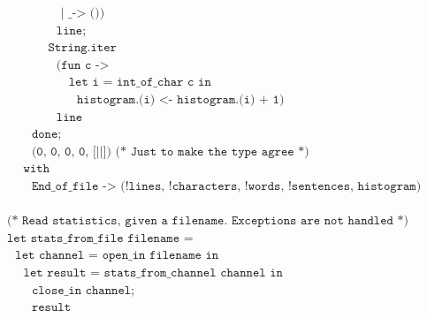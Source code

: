 \documentclass[]{book}
\newcommand{\smspace}{\vspace{4mm}}
\begin{document}
\begin{center}
{\begin{minipage}{0.9\textwidth}
$\texttt{~~~~~~~~~~~~~| \_ -> ())}$\\
$\texttt{~~~~~~~~~~~~line;}$\\
$\texttt{~~~~~~~~~~String.iter}$\\
$\texttt{~~~~~~~~~~~~(fun c ->}$\\
$\texttt{~~~~~~~~~~~~~~~let i = int\_of\_char c in}$\\
$\texttt{~~~~~~~~~~~~~~~~~histogram.(i) <- histogram.(i) + 1)}$\\
$\texttt{~~~~~~~~~~~~line}$\\
$\texttt{~~~~~~done;}$\\
$\texttt{~~~~~~(0, 0, 0, 0, [||]) (* Just to make the type agree *)}$\\
$\texttt{~~~~with}$\\
$\texttt{~~~~~~End\_of\_file -> (!lines, !characters, !words, !sentences, histogram)}$\\
\\
$\texttt{(* Read statistics, given a filename.\ Exceptions are not handled *)}$\\
$\texttt{let stats\_from\_file filename =}$\\
$\texttt{~~let channel = open\_in filename in}$\\
$\texttt{~~~~let result = stats\_from\_channel channel in}$\\
$\texttt{~~~~~~close\_in channel;}$\\
$\texttt{~~~~~~result}$\vphantom{g}
\end{minipage}}
\end{center}

\smspace
\end{document}
